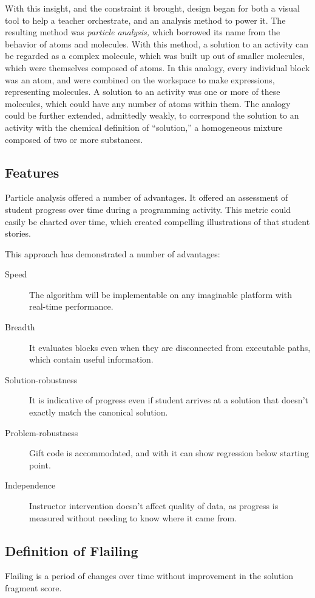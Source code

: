 With this insight, and the constraint it brought, design began for both a visual tool to help a teacher orchestrate, and an analysis method to power it. The resulting method was \emph{particle analysis,} which borrowed its name from the behavior of atoms and molecules. With this method, a solution to an activity can be regarded as a complex molecule, which was built up out of smaller molecules, which were themselves composed of atoms. In this analogy, every individual block was an atom, and were combined on the workspace to make expressions, representing molecules. A solution to an activity was one or more of these molecules, which could have any number of atoms within them. The analogy could be further extended, admittedly weakly, to correspond the solution to an activity with the chemical definition of ``solution,'' a homogeneous mixture composed of two or more substances. 


\subsection{Features}
Particle analysis offered a number of advantages. It offered an assessment of student progress over time during a programming activity. This metric could easily be charted over time, which created compelling illustrations of that student stories. 

This approach has demonstrated a number of advantages:
\begin{description}
\item [Speed] The algorithm will be implementable on any imaginable platform with real-time performance. 
\item [Breadth] It evaluates blocks even when they are disconnected from executable paths, which contain useful information.
\item [Solution-robustness] It is indicative of progress even if student arrives at a solution that doesn't exactly match the canonical solution.
\item [Problem-robustness] Gift code is accommodated, and with it can show regression below starting point.
\item [Independence] Instructor intervention doesn't affect quality of data, as progress is measured without needing to know where it came from.
\end{description}

\subsection{Definition of Flailing}
Flailing is a period of changes over time without improvement in the solution fragment score. %


